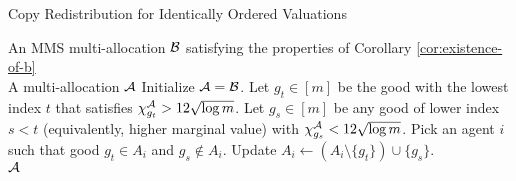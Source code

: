 \begin{algorithm}
\caption{Copy Redistribution for Identically Ordered Valuations}\label{alg:copy-redistribution} 
\begin{algorithmic}[1]
        \REQUIRE An MMS multi-allocation $\mathcal{B}$ satisfying the properties of Corollary \ref{cor:existence-of-b}\\ 
        \ENSURE A multi-allocation $\mathcal{A}$
        \STATE Initialize $\mathcal{A} = \mathcal{B}$. 
        \STATE Let $g_t \in [m]$ be the good with the lowest index $t$ that satisfies $\chi^{\mathcal{A}}_{g_t} > 12 \sqrt{\log m}$. \label{line:lowgood}
        \STATE Let $g_s \in [m]$ be any good of lower index $s < t$ (equivalently, higher marginal value) with $\chi^{\mathcal{A}}_{g_s} < 12 \sqrt{\log m}$. \label{line:highgood}
        \STATE Pick an agent $i$ such that good $g_t \in A_i$ and $g_s \notin A_i$. 
        \STATE Update $A_i \gets \left( A_i\setminus\{g_t \} \right) \cup\{g_s \}$. \\ 
        \ENDWHILE
    \RETURN $\mathcal{A}$
\end{algorithmic}
\end{algorithm}


